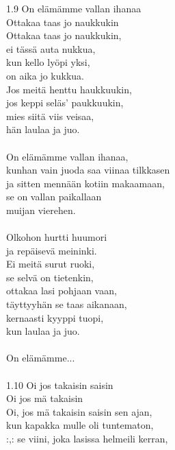 1.9 On elämämme vallan ihanaa \\
Ottakaa taas jo naukkukin \\
            Ottakaa taas jo naukkukin, \\
            ei tässä auta nukkua, \\
            kun kello lyöpi yksi, \\
            on aika jo kukkua. \\
            Jos meitä henttu haukkuukin, \\
            jos keppi seläs' paukkuukin, \\
            mies siitä viis veisaa, \\
            hän laulaa ja juo. \\
\hspace{10mm} \\
            On elämämme vallan ihanaa, \\
            kunhan vain juoda saa viinaa tilkkasen \\
            ja sitten mennään kotiin makaamaan, \\
            se on vallan paikallaan \\
            muijan vierehen. \\
\hspace{10mm} \\
            Olkohon hurtti huumori \\
            ja repäisevä meininki. \\
            Ei meitä surut ruoki, \\
            se selvä on tietenkin, \\
            ottakaa lasi pohjaan vaan, \\
            täyttyyhän se taas aikanaan, \\
            kernaasti kyyppi tuopi, \\
            kun laulaa ja juo. \\
\hspace{10mm} \\
            On elämämme... \\
\hspace{10mm} \\
1.10 Oi jos takaisin saisin \\
Oi jos mä takaisin \\
            Oi, jos mä takaisin saisin sen ajan, \\
            kun kapakka mulle oli tuntematon, \\
            :,: se viini, joka lasissa helmeili kerran, \\
